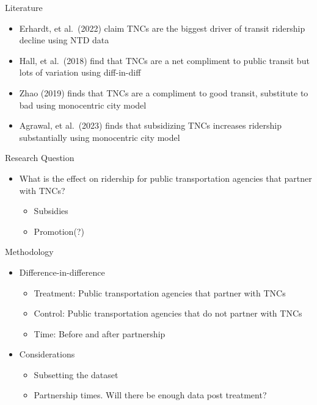 \documentclass[
  ignorenonframetext,
]{beamer}
\providecommand{\tightlist}{%
  \setlength{\itemsep}{0pt}\setlength{\parskip}{0pt}}
\begin{document}
\begin{frame}{Literature}
\protect\hypertarget{literature}{}
\begin{itemize}
\tightlist
\item
  Erhardt, et al.~(2022) claim TNCs are the biggest driver of transit
  ridership decline using NTD data
\item
  Hall, et al.~(2018) find that TNCs are a net compliment to public
  transit but lots of variation using diff-in-diff
\item
  Zhao (2019) finds that TNCs are a compliment to good transit,
  substitute to bad using monocentric city model
\item
  Agrawal, et al.~(2023) finds that subsidizing TNCs increases ridership
  substantially using monocentric city model
\end{itemize}
\end{frame}

\begin{frame}{Research Question}
\protect\hypertarget{research-question}{}
\begin{itemize}
\tightlist
\item
  What is the effect on ridership for public transportation agencies
  that partner with TNCs?

  \begin{itemize}
  \tightlist
  \item
    Subsidies
  \item
    Promotion(?)
  \end{itemize}
\end{itemize}
\end{frame}

\begin{frame}{Methodology}
\protect\hypertarget{methodology}{}
\begin{itemize}
\tightlist
\item
  Difference-in-difference

  \begin{itemize}
  \tightlist
  \item
    Treatment: Public transportation agencies that partner with TNCs
  \item
    Control: Public transportation agencies that do not partner with
    TNCs
  \item
    Time: Before and after partnership
  \end{itemize}
\item
  Considerations

  \begin{itemize}
  \tightlist
  \item
    Subsetting the dataset
  \item
    Partnership times. Will there be enough data post treatment?
  \end{itemize}
\end{itemize}
\end{frame}
\end{document}
